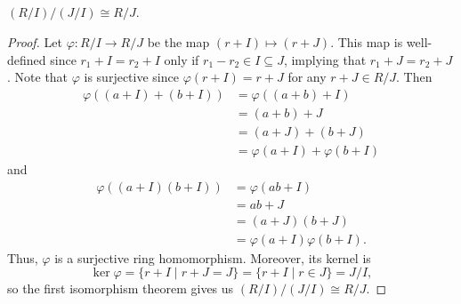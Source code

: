 \documentclass[12pt]{article}
\newenvironment{problem}
    {\begin{lrbox}{\mybox}\begin{minipage}{0.98\textwidth}}
    {\end{minipage}\end{lrbox}\begin{center}\framebox[\textwidth]{\usebox{\mybox}}\end{center}}
\theoremstyle{definition}
\renewcommand{\phi}{\varphi}
\newcommand{\isom}{\cong}
\begin{document}
\subsection{}
\begin{problem}
    $(R/I)/(J/I) \isom R/J$.
\end{problem}

\begin{proof}
    Let $\phi : R/I \to R/J$ be the map $(r + I) \mapsto (r + J)$. This map is well-defined since $r_1 + I = r_2 + I$ only if $r_1 - r_2 \in I \subseteq J$, implying that $r_1 + J = r_2 + J$. Note that $\phi$ is surjective since $\phi(r + I) = r + J$ for any $r + J \in R/J$. Then
    \begin{align*}
        \phi((a + I) + (b + I))
            &= \phi((a + b) + I) \\
            &= (a + b) + J \\
            &= (a + J) + (b + J) \\
            &= \phi(a + I) + \phi(b + I) 
    \end{align*}
    and
    \begin{align*}
        \phi((a + I)(b + I))
            &= \phi(ab + I) \\
            &= ab + J \\
            &= (a + J)(b + J) \\
            &= \phi(a + I)\phi(b + I).
    \end{align*}
    Thus, $\phi$ is a surjective ring homomorphism. Moreover, its kernel is
    \[
        \ker \phi = \{r + I \mid r + J = J\} = \{r + I \mid r \in J\} = J/I,
    \]
    so the first isomorphism theorem gives us $(R/I)/(J/I) \isom R/J$.
    
\end{proof}
\end{document}
